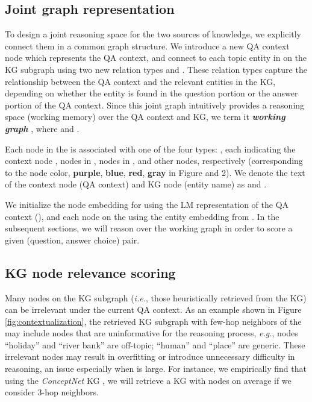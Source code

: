 \documentclass[11pt]{article}
\newcommand{\eg}{\textit{e.g.}}
\newcommand{\ie}{\textit{i.e.}}
\renewcommand\ttdefault{cmtt}
\begin{document}
\subsection{Joint graph representation}
\label{sec:method-joint-graph}

To design a joint reasoning space for the two sources of knowledge, we explicitly connect them in a common graph structure. We introduce a new QA context node  which represents the QA context, 
and connect  to each topic entity in  on the KG subgraph  using two new relation types  and .
These relation types capture the relationship between the QA context and the relevant entities in the KG, depending on whether the entity is found in the question portion or the answer portion of the QA context.
Since this joint graph intuitively provides a reasoning space (working memory) over the QA context and KG, we term it \textit{\textbf{working graph}} , where  and . 

Each node in the  is associated with one of the four types: , each indicating the context node , nodes in , nodes in , and other nodes, respectively (corresponding to the node color, \textcolor{purplenode}{\textbf{purple}}, \textcolor{bluenode}{\textbf{blue}}, \textcolor{rednode}{\textbf{red}}, \textcolor{graynode}{\textbf{gray}} in Figure  and 2). 
We denote the text of the context node  (QA context) and KG node  (entity name) as  and .

We initialize the node embedding for  using the LM representation of the QA context
(),
and each node on the  using the entity embedding from \citet{feng2020scalable}. 
In the subsequent sections, we will reason over the working graph in order to score a given (question, answer choice) pair.



\subsection{KG node relevance scoring}
\label{sec:method-contextualization}
\renewcommand\ttdefault{cmtt}

Many nodes on the KG subgraph  (\ie, those heuristically retrieved from the KG) can be irrelevant under the current QA context. As an example shown in Figure \ref{fig:contextualization}, the retrieved KG subgraph  with few-hop neighbors of the  may include nodes that are uninformative for the reasoning process, \eg, nodes ``holiday'' and ``river bank'' are off-topic; ``human'' and ``place'' are generic. 
These irrelevant nodes may result in overfitting or introduce unnecessary difficulty in reasoning, an issue especially when  is large. For instance, we empirically find that using the \emph{ConceptNet} KG \cite{speer2016conceptnet}, we will retrieve a KG with  nodes on average if we consider 3-hop neighbors.
\end{document}
